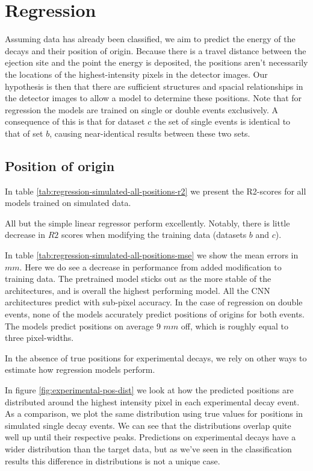 \section{Regression}
Assuming data has already been classified, we aim to predict the energy of the decays and their
position of origin. Because there is a travel distance between the 
ejection site and the point the energy is deposited, the positions aren't necessarily
the locations of the highest-intensity pixels in the detector images. Our hypothesis is
then that there are sufficient structures and spacial relationships in the detector images to
allow a model to determine these positions.
Note that for regression the models are trained on single or double events exclusively.
A consequence of this is that for dataset $c$ the set of single events is
identical to that of set $b$, causing near-identical results between these two sets.

\subsection{Position of origin}
In table \ref{tab:regression-simulated-all-positions-r2} we present the R2-scores for all models
trained on simulated data.

\noindent All but the simple linear regressor perform excellently. Notably, there is
little decrease in $R2$ scores when modifying the training data (datasets $b$ and $c$).

In table \ref{tab:regression-simulated-all-positions-mse} we show the mean errors in $mm$.
Here we do see a decrease in performance from added modification to training data.
The pretrained model sticks out as the more stable of the architectures, and is overall
the highest performing model. All the CNN architectures predict with sub-pixel accuracy.
In the case of regression on double events, none of the models accurately
predict positions of origins for both events. The models predict positions on average
9 $mm$ off, which is roughly equal to three pixel-widths.

In the absence of true positions for experimental decays, we rely on other
ways to estimate how regression models perform.

In figure \ref{fig:experimental-pos-dist} we look at how the predicted positions
are distributed around the highest intensity pixel in each experimental decay event.
As a comparison, we plot the same distribution using true values for positions in
simulated single decay events. We can see that the distributions overlap quite well
up until their respective peaks. Predictions on experimental decays have a wider
distribution than the target data, but as we've seen in the classification results this
difference in distributions is not a unique case.

